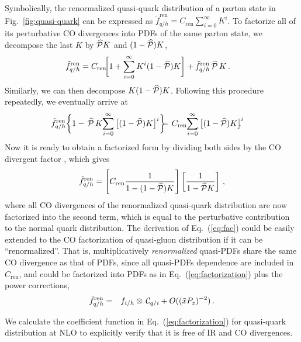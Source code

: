 \documentclass[twocolumn,aps,prl,superscriptaddress,nofootinbib,showpacs]{revtex4-1}
\newcommand{\sect}[1]{\noindent{\it \textbf{#1} ---}}
\begin{document}
Symbolically, the renormalized quasi-quark distribution of a parton state  in Fig.~\ref{fig:quasi-quark}  can be expressed as $\tilde{f}_{q/h}^{\text{ren}}= {C}_\text{ren} \sum_{i=0}^\infty {K}^i$.  To factorize all of its perturbative CO divergences into PDFs of the same parton state, we decompose the last $K$ by $\widehat{\cal P}{K}$ and $(1-\widehat{\cal P}) {K}$,
\begin{align}\label{eq:fac-co0}
\tilde{f}_{q/h}^{\text{ren}}
 &=
 {C}_\text{ren}
{\hskip -0.03in} \bigg[
1 + \sum_{i=0}^{\infty} {K}^{i} (1-\widehat{\cal P}) {K}\bigg]
+ \tilde{f}_{q/h}^{\text{ren}}\, \widehat{\cal P}\, {K}\, .
\end{align}
Similarly, we can then decompose $K (1-\widehat{\cal P}) {K}$. Following this procedure repeatedly, we eventually arrive at
\begin{eqnarray}\label{eq:fac-co}
\tilde{f}_{q/h}^{\text{ren}} \bigg\{ 1-\, \widehat{\cal P}\, {K}
{\hskip -0.03in}
\sum_{i=0}^{\infty} \big[(1-\widehat{\cal P}) {K}\big]^i\bigg\}
{\hskip -0.1in} &=& {\hskip -0.08in}
 {C}_\text{ren}
{\hskip -0.03in}
\sum_{i=0}^{\infty} \big[(1-\widehat{\cal P}) {K}\big]^i {\hskip -0.08in} .~~~~
\end{eqnarray}
Now it is ready to obtain a factorized form by dividing both sides by the CO divergent factor  \cite{Ellis:1978ty}, which gives
\begin{equation}
\tilde{f}_{q/h}^{\text{ren}} = \left[
{C}_\text{ren} \frac{1}{1-(1-\widehat{\cal P}){K}}\right]
\left[
\frac{1}{1-\widehat{\cal P}{K}}
\right]\,,
\label{eq:fac}
\end{equation}
where all CO divergences of the renormalized quasi-quark distribution are now factorized into the second term, which is equal to the perturbative contribution to the normal quark distribution.
The derivation of  Eq.~(\ref{eq:fac}) could be easily extended to the CO factorization of quasi-gluon distribution if it can be ``renormalized''.  That is, multiplicatively {\it renormalized} quasi-PDFs share the same CO divergence as that of PDFs, since all quasi-PDFs dependence are included in $C_\text{ren}$, and could be factorized into PDFs as in Eq.~(\ref{eq:factorization}) plus the power corrections,
\begin{eqnarray}
\tilde{f}_{q/h}^{\text{ren}} &= &
 f_{i/h}\otimes\,
{\cal C}_{q/i}+ O((\tilde{x}P_z)^{-2})\,.
\label{eq:facQuasi}
\end{eqnarray}

\sect{The coefficient functions at NLO}
We calculate the coefficient function in Eq.~(\ref{eq:factorization}) for quasi-quark distribution at NLO to explicitly verify that it is free of IR and CO divergences.
\end{document}
